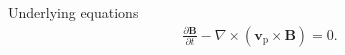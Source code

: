 \documentclass[10pt,aspectratio=169,usenames,dvipsnames]{beamer}
\begin{document}
\begin{frame}{Underlying equations}
\begin{gather}
\frac{\partial \textbf{B}}{\partial t} - \nabla \times (\textbf{v}_{\text{p}} \times \textbf{B}) = 0.\tag{11}
\end{gather}
\end{frame}


\end{document}
